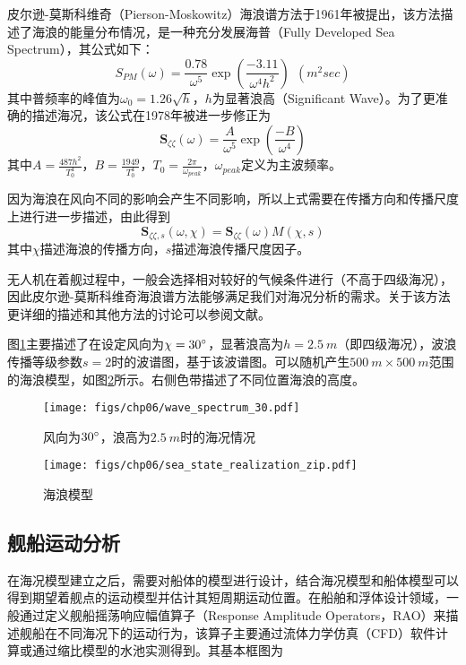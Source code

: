皮尔逊-莫斯科维奇（Pierson-Moskowitz）海浪谱方法于1961年被提出，该方法描述了海浪的能量分布情况，是一种充分发展海普（Fully Developed Sea Spectrum），其公式如下：
\begin{equation}
 S_{PM}(\omega) =\frac{0.78}{\omega^5}\exp(\frac{-3.11}{\omega^4h^2})\ \ (m^2sec)
\end{equation}
 其中普频率的峰值为$\omega_0=1.26\sqrt{h}$，$h$为显著浪高（Significant Wave）。为了更准确的描述海况，该公式在1978年被进一步修正为
\begin{equation}
\mathbf{S}_{\zeta \zeta}(\omega) = \frac{A}{\omega^5}\exp(\frac{-B}{\omega^4})
\end{equation}
其中$A=\frac{487h^2}{T_0^4}$，$B=\frac{1949}{T_0^4}$，$T_0=\frac{2\pi}{\omega_{peak}}$，$\omega_{peak}$定义为主波频率。

因为海浪在风向不同的影响会产生不同影响，所以上式需要在传播方向和传播尺度上进行进一步描述，由此得到
\begin{equation}
\mathbf{S}_{\zeta\zeta,s}(\omega,\chi) = \mathbf{S}_{\zeta\zeta}(\omega)M(\chi,s)
\end{equation}
其中$\chi$描述海浪的传播方向，$s$描述海浪传播尺度因子。

无人机在着舰过程中，一般会选择相对较好的气候条件进行（不高于四级海况），因此皮尔逊-莫斯科维奇海浪谱方法能够满足我们对海况分析的需求。关于该方法更详细的描述和其他方法的讨论可以参阅文献\cite{perez2002simple}。
 
图\ref{fig:wave_spectrum_30}主要描述了在设定风向为$\chi =30\degree$，显著浪高为$h  =2.5\ m$（即四级海况），波浪传播等级参数$s=2$时的波谱图，基于该波谱图。可以随机产生$500\ m \times 500\ m$范围的海浪模型，如图\ref{fig:sea_state_realization_zip}所示。右侧色带描述了不同位置海浪的高度。
 \begin{figure}[!ht]
 	\centering
 	\texttt{[image: figs/chp06/wave\_spectrum\_30.pdf]}	
 	\caption{风向为$30\degree$，浪高为$2.5\ m$时的海况情况}
 	\label{fig:wave_spectrum_30}
 \end{figure}

 \begin{figure}[!ht]
	\centering
	\texttt{[image: figs/chp06/sea\_state\_realization\_zip.pdf]}	
	\caption{海浪模型}
	\label{fig:sea_state_realization_zip}
\end{figure}

\subsection{舰船运动分析}
在海况模型建立之后，需要对船体的模型进行设计，结合海况模型和船体模型可以得到期望着舰点的运动模型并估计其短周期运动位置。在船舶和浮体设计领域，一般通过定义舰船摇荡响应幅值算子（Response Amplitude Operators，RAO）来描述舰船在不同海况下的运动行为，该算子主要通过流体力学仿真（CFD）软件计算或通过缩比模型的水池实测得到。其基本框图为


